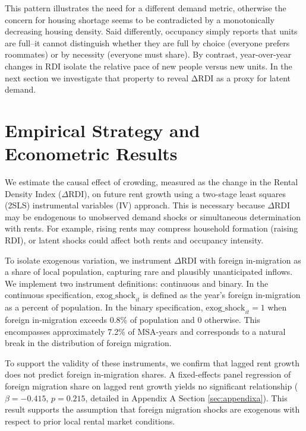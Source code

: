 \documentclass[APA,Times1COL]{WileyNJDv5} %
\begin{document}
This pattern illustrates the need for a different demand metric, otherwise the concern for housing shortage seems to be contradicted by a monotonically decreasing housing density. Said differently, occupancy simply reports that units are full--it cannot distinguish whether they are full by choice (everyone prefers roommates) or by necessity (everyone must share). By contrast, year-over-year changes in RDI isolate the relative pace of new people versus new units. In the next section we investigate that property to reveal ΔRDI as a proxy for latent demand. 

\section{Empirical Strategy and Econometric Results}
\label{sec:instrumental-variable}

We estimate the causal effect of crowding, measured as the change in the Rental Density Index (\(\Delta \text{RDI}\)), on future rent growth using a two-stage least squares (2SLS) instrumental variables (IV) approach. This is necessary because \(\Delta \text{RDI}\) may be endogenous to unobserved demand shocks or simultaneous determination with rents. For example, rising rents may compress household formation (raising RDI), or latent shocks could affect both rents and occupancy intensity.

To isolate exogenous variation, we instrument \(\Delta \text{RDI}\) with foreign in-migration as a share of local population, capturing rare and plausibly unanticipated inflows. We implement two instrument definitions: continuous and binary. In the continuous specification, \(\text{exog\_shock}_{it}\) is defined as the year's foreign in-migration as a percent of population. In the binary specification, \(\text{exog\_shock}_{it} = 1\) when foreign in-migration exceeds 0.8\% of population and 0 otherwise. This encompasses approximately 7.2\% of MSA-years and corresponds to a natural break in the distribution of foreign migration. 

To support the validity of these instruments, we confirm that lagged rent growth does not predict foreign in-migration shares. A fixed-effects panel regression of foreign migration share on lagged rent growth yields no significant relationship ($\beta = -0.415$, $p = 0.215$, detailed in Appendix A Section \ref{sec:appendixa}). This result supports the assumption that foreign migration shocks are exogenous with respect to prior local rental market conditions.
\end{document}

